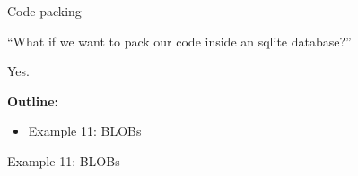 \documentclass{beamer}
\begin{document}
\begin{frame}{Code packing}

\vspace{2pt}\hspace{.5cm} ``What if we want to  pack our code inside an sqlite database?''

\vspace{12pt}\hspace{6.5cm} \Large{Yes.}

\vspace{12pt}
\large {\bf Outline:}
\begin{itemize}
\item Example 11: BLOBs
\end{itemize}

\end{frame}
\begin{frame}{Example 11: BLOBs }

\begin{columns}


\end{columns}

\end{frame}
\end{document}
